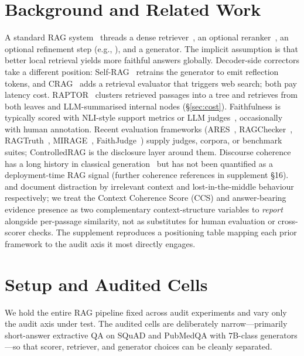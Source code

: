 \section{Background and Related Work}
\label{sec:bg}

A standard RAG system~\citep{lewis2020rag,gao2024ragsurvey} threads a
dense retriever~\citep{karpukhin2020dpr,xiong2024embedder}, an optional
reranker~\citep{nogueira2019passage}, an optional refinement step
(e.g., \citet{xu2024recomp}), and a generator. The implicit assumption
is that better local retrieval yields more faithful answers globally.
Decoder-side correctors take a different position:
Self-RAG~\citep{asai2024selfrag} retrains the generator to emit
reflection tokens, and CRAG~\citep{yan2024crag} adds a retrieval
evaluator that triggers web search; both pay latency cost.
RAPTOR~\citep{raptor2024} clusters retrieved passages into a tree and
retrieves from both leaves and LLM-summarised internal nodes
(\S\ref{sec:cost}). Faithfulness is typically scored with NLI-style
support metrics or LLM
judges~\citep{honovich2022true,laban2022summac,es2024ragas},
occasionally with human annotation. Recent evaluation frameworks
(ARES~\citep{saadfalcon2024ares}, RAGChecker~\citep{ru2024ragchecker},
RAGTruth~\citep{niu2024ragtruth}, MIRAGE~\citep{park2025mirage},
FaithJudge~\citep{tamber2025faithjudge}) supply judges, corpora, or
benchmark suites; ControlledRAG is the disclosure layer around them.
Discourse coherence has a long history in classical
generation~\citep{li2014coherence} but has not been quantified as a
deployment-time RAG signal (further coherence references in
supplement \S 16).
\citet{shi2023large} and \citet{liu2024lostmiddle} document
distraction by irrelevant context and lost-in-the-middle behaviour
respectively; we treat the Context Coherence Score (CCS) and
answer-bearing evidence presence as two complementary
context-structure variables to \emph{report} alongside per-passage
similarity, not as substitutes for human evaluation or cross-scorer
checks. The supplement reproduces a positioning table mapping each
prior framework to the audit axis it most directly engages.

\section{Setup and Audited Cells}
\label{sec:setup}

We hold the entire RAG pipeline fixed across audit experiments and vary
only the audit axis under test. The audited cells are deliberately
narrow---primarily short-answer extractive QA on SQuAD and PubMedQA
with $7$B-class generators---so that scorer, retriever, and generator
choices can be cleanly separated.

